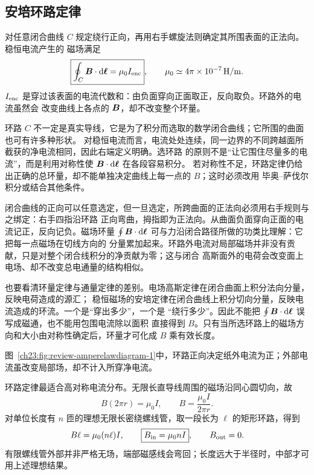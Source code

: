 {\subsection{安培环路定律}


对任意闭合曲线 $C$ 规定绕行正向，再用右手螺旋法则确定其所围表面的正法向。稳恒电流产生的
磁场满足
\begin{equation}
  \boxed{\oint_C\bm{B}\cdot\mathop{}\!\mathrm d\bm{\ell}=\mu_0 I_{\rm enc}},
  \qquad
  \mu_0\simeq4\pi\times10^{-7}\,\mathrm{H/m}.
\end{equation}
$I_{\rm enc}$ 是穿过该表面的电流代数和：由负面穿向正面取正，反向取负。环路外的电流虽然会
改变曲线上各点的 $\bm{B}$，却不改变整个环量。

环路 $C$ 不一定是真实导线，它是为了积分而选取的数学闭合曲线；它所围的曲面也可有许多种形状。
对稳恒电流而言，电流处处连续，同一边界的不同跨越面所截获的净电流相同，因此右端定义明确。选环路
的原则不是“让它围住尽量多的电流”，而是利用对称性使 $\bm{B}\cdot\mathop{}\!\mathrm d\bm{\ell}$ 在各段容易积分。
若对称性不足，环路定律仍给出正确的总环量，却不能单独决定曲线上每一点的 $B$；这时必须改用
毕奥--萨伐尔积分或结合其他条件。

闭合曲线的正向可以任意选定，但一旦选定，所跨曲面的正法向必须用右手规则与之绑定：右手四指沿环路
正向弯曲，拇指即为正法向。从曲面负面穿向正面的电流记正，反向记负。磁场环量
$\oint\bm{B}\cdot\mathop{}\!\mathrm d\bm{\ell}$ 可与力沿闭合路径所做的功类比理解：它把每一点磁场在切线方向的
分量累加起来。环路外电流对局部磁场并非没有贡献，只是对整个闭合线积分的净贡献为零；这与闭合
高斯面外的电荷会改变面上电场、却不改变总电通量的结构相似。

也要看清环量定律与通量定律的差别。电场高斯定律在闭合曲面上积分法向分量，反映电荷造成的源汇；
稳恒磁场的安培定律在闭合曲线上积分切向分量，反映电流造成的环流。一个是“穿出多少”，一个是
“绕行多少”。因此不能把 $\oint\bm{B}\cdot\mathop{}\!\mathrm d\bm{\ell}$ 误写成磁通，也不能用包围电流除以面积
直接得到 $B$。只有当所选环路上的磁场方向和大小由对称性确定后，环量才可化成 $B$ 乘有效长度。

图~\ref{ch23:fig:review-amperelawdiagram-1}中，环路正向决定纸外电流为正；外部电流虽改变局部场，却不计入所穿净电流。
\par\noindent\begin{minipage}{\linewidth}
\ampereLawDiagram
{}
\end{minipage}\par\medskip

环路定律最适合高对称电流分布。无限长直导线周围的磁场沿同心圆切向，故
\begin{equation}
  B(2\pi r)=\mu_0I,
  \qquad
  \boxed{B=\frac{\mu_0I}{2\pi r}}.
\end{equation}
对单位长度有 $n$ 匝的理想无限长密绕螺线管，取一段长为 $\ell$ 的矩形环路，得到
\begin{equation}
  B\ell=\mu_0(n\ell)I,
  \qquad
  \boxed{B_{\rm in}=\mu_0nI},
  \qquad B_{\rm out}=0.
\end{equation}
有限螺线管外部并非严格无场，端部磁感线会弯回；长度远大于半径时，中部才可用上述理想结果。

}
